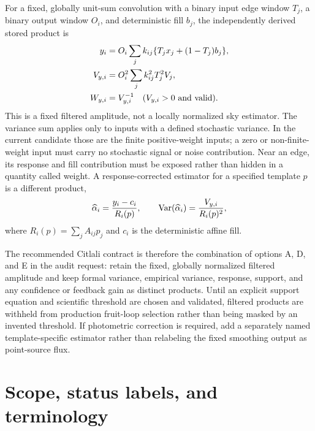 \documentclass[11pt]{article}
\newcommand{\Var}{\operatorname{Var}}
\begin{document}
For a fixed, globally unit-sum convolution with a binary input edge window
$T_j$, a binary output window $O_i$, and deterministic fill $b_j$, the
independently derived stored product is
\begin{align}
 y_i &= O_i\sum_j k_{ij}\{T_jx_j+(1-T_j)b_j\},
 \label{eq:fixed-edge-signal}\\
 V_{y,i} &= O_i^2\sum_j k_{ij}^2T_j^2V_j,
 \label{eq:fixed-edge-var}\\
 W_{y,i} &= V_{y,i}^{-1}\quad(V_{y,i}>0\hbox{ and valid}).
 \label{eq:fixed-edge-weight}
\end{align}
This is a fixed filtered amplitude, not a locally normalized sky estimator.
The variance sum applies only to inputs with a defined stochastic variance.
In the current candidate those are the finite positive-weight inputs; a zero
or non-finite-weight input must carry no stochastic signal or noise
contribution.
Near an edge, its response and fill contribution must be exposed rather than
hidden in a quantity called weight.  A response-corrected estimator for a
specified template $p$ is a different product,
\begin{equation}
 \widehat\alpha_i={y_i-c_i\over R_i(p)},\qquad
 \Var(\widehat\alpha_i)={V_{y,i}\over R_i(p)^2},
 \label{eq:response-corrected-summary}
\end{equation}
where $R_i(p)=\sum_jA_{ij}p_j$ and $c_i$ is the deterministic affine fill.

The recommended Citlali contract is therefore the combination of options A,
D, and E in the audit request: retain the fixed, globally normalized filtered
amplitude and keep formal variance, empirical variance, response, support, and
any confidence or feedback gain as distinct products.  Until an explicit
support equation and scientific threshold are chosen and validated, filtered
products are withheld from production fruit-loop selection rather than being
masked by an invented threshold.  If photometric correction is required, add
a separately named template-specific estimator rather than relabeling the
fixed smoothing output as point-source flux.

\section{Scope, status labels, and terminology}
\label{sec:scope}
\end{document}
